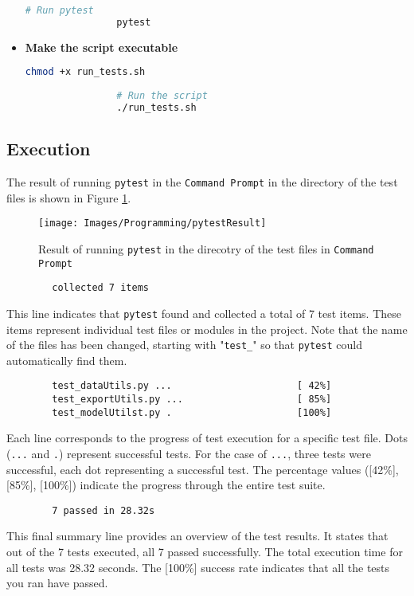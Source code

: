 \begin{itemize}
\begin{lstlisting}[language=Python, caption={Bash Script for Running Pytest in a Specific Directory}, label={code:run-pytest-bash}, style=pythonstyle]
				# Run pytest
				pytest
			\end{lstlisting}
			
				
				\item \textbf{Make the script executable}
				
			\begin{lstlisting}[language=Bash, caption={Setting Executable Permission and Running the Script}, label={code:set-permission-and-run}, style=bashstyle]
				chmod +x run_tests.sh
				
				# Run the script
				./run_tests.sh
			\end{lstlisting}
			
			\end{itemize}
	\subsection{Execution}
	
	The result of running \texttt{pytest} in the \texttt{Command Prompt} in the directory of the test files is shown in Figure \ref{fig:pytestResult}.
	
	\begin{figure}[h!]
		\centering
		\texttt{[image: Images/Programming/pytestResult]}
		\caption{Result of running \texttt{pytest} in the direcotry of the test files in \texttt{Command Prompt}} 
		\label{fig:pytestResult}
	\end{figure}
	
	\begin{verbatim}
		collected 7 items
	\end{verbatim}
	
	This line indicates that \texttt{pytest} found and collected a total of 7 test items. These items represent individual test files or modules in the project. Note that the name of the files has been changed, starting with "\texttt{test\_}" so that \texttt{pytest} could automatically find them.
	
	\begin{verbatim}
		test_dataUtils.py ...                      [ 42%]
		test_exportUtils.py ...                    [ 85%]
		test_modelUtilst.py .                      [100%]
	\end{verbatim}
	
	Each line corresponds to the progress of test execution for a specific test file. Dots (\texttt{...} and \texttt{.}) represent successful tests. For the case of \texttt{...}, three tests were successful, each dot representing a successful test. The percentage values ([42\%], [85\%], [100\%]) indicate the progress through the entire test suite.
	
	\begin{verbatim}
		7 passed in 28.32s 
	\end{verbatim}
	
	This final summary line provides an overview of the test results. It states that out of the 7 tests executed, all 7 passed successfully. The total execution time for all tests was 28.32 seconds. The [100\%] success rate indicates that all the tests you ran have passed.